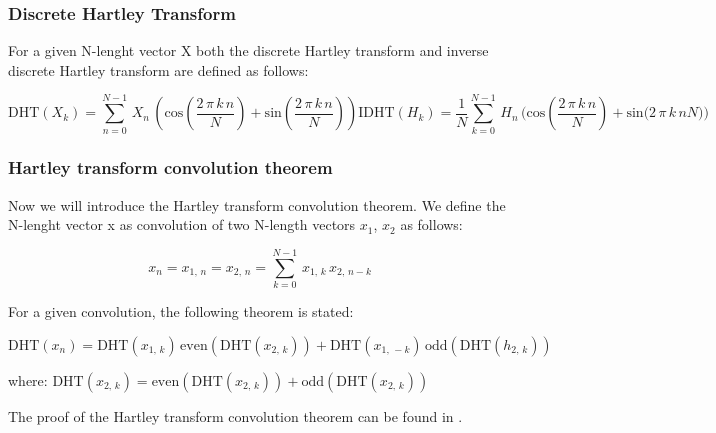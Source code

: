 \documentclass[12pt,twoside,a4paper]{article}
\numberwithin{equation}{subsection}
\numberwithin{figure}{subsection}
\begin{document}
\subsubsection*{Discrete Hartley Transform}

For a given N-lenght vector X both the discrete Hartley transform and inverse discrete Hartley transform are defined as follows:

\begin{subequations} \label{eq:fhta_definition}
  \begin{equation}   \label{eq:fhtadef_dht}
    \mathrm{DHT}({X_{k}})=\sum_{n=0}^{N - 1}\,{X_{n}}\,(\mathrm{cos}(\frac {2\,\pi \,k\,n}{N}) + \mathrm{sin}(\frac {2\,\pi
    \,k\,n}{N}))
  \end{equation}
  \begin{equation}   \label{eq:fhtadef_idht}
    \mathrm{IDHT}({H_{k}})=\frac {1}{N} {\sum_{k=0}^{N - 1}\,{H_{n}}\,(\mathrm{cos}(\frac {2\,\pi \,k\,n}{N}) + \mathrm{sin}(2\,\pi
     \,k\,n}{N})) 
  \end{equation}
\end{subequations}

\subsubsection*{Hartley transform convolution theorem}

Now we will introduce the Hartley transform convolution theorem. We define the N-lenght vector x as convolution of two N-length
vectors ${x_{1}}$, ${x_{2}}$ as follows:

\begin{equation} \label{eq:hartley_convolution}
  {x_{n}}={x_{1, \,n}} = {x_{2, \,n}} = \sum_{k=0}^{N - 1}\,{x_{1, \,k}}\,{x_{2, \,n - k}} 
\end{equation}

For a given convolution, the following theorem is stated:

\begin{equation} \label{eq:hartley_theorem}
  \mathrm{DHT}({x_{n}})=\mathrm{DHT}({x_{1, \,k}})\,\mathrm{even}(\mathrm{DHT}({x_{2, \,k}})) + \mathrm{DHT}({x_{1, \, -
  k}})\,\mathrm{odd}(\mathrm{DHT}({h_{2, \,k}}))
\end{equation}

where: $\mathrm{DHT}({x_{2, \,k}})=\mathrm{even}(\mathrm{DHT}({x_{2, \,k}})) + \mathrm{odd}(\mathrm{DHT}({x_{2, \,k}}))$%

The proof of the Hartley transform convolution theorem can be found in \cite{chang_computation}. 
\end{document}
